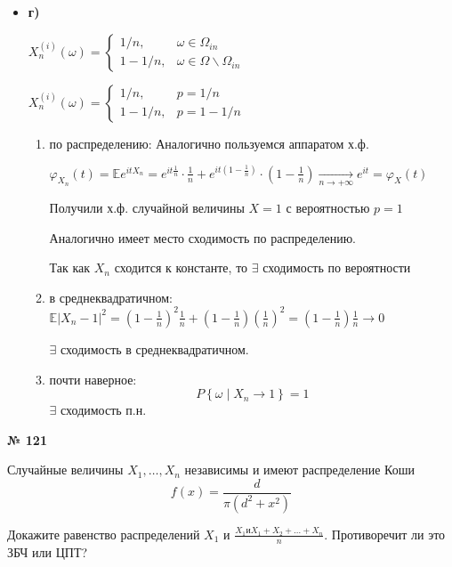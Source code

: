 \documentclass[a4paper,12pt]{article}
\newcommand{\lt}{\left}
\newcommand{\rt}{\right}
\newcommand{\fr}{\frac}
\newcommand{\bb}{\mathbb}
\newcommand{\om}{\Omega}
\newcommand{\vp}{\varphi}
\begin{document}
\begin{itemize}
\begin{enumerate}
\end{enumerate}

\item \textbf{г)}

$X_n^{(i)}(\omega) = 
\begin{cases}
1/n,& \omega \in \om_{in}\\
1 - 1/n,& \omega \in \om\backslash\om_{in}
\end{cases}
$

$X_n^{(i)}(\omega) = 
\begin{cases}
1/n,& p = 1/n\\
1 - 1/n,& p =  1 - 1/n
\end{cases}
$
\begin{enumerate}
\item по распределению:
Аналогично пользуемся аппаратом х.ф.

$\vp_{X_n}(t) = \bb E e^{itX_n} = e^{it\fr{1}{n}}\cdot\fr{1}{n} + e^{it\lt(1 - \fr{1}{n} \rt)}\cdot\lt(1 - \fr{1}{n}\rt) \xrightarrow[n \to +\infty]{} e^{it} = \vp_X(t)$

Получили х.ф. случайной величины $X = 1$ с вероятностью $p = 1$

Аналогично имеет место сходимость по распределению.

Так как $X_n$ сходится к константе, то $\exists$ сходимость по вероятности

\item в среднеквадратичном:
$\bb E|X_n - 1|^2  = \lt(1 - \fr{1}{n}\rt)^2\fr{1}{n} + \lt(1 - \fr{1}{n}\rt)\lt(\fr{1}{n}\rt)^2 = \lt(1 - \fr{1}{n}\rt)\fr{1}{n}\rightarrow 0$

$\exists$ сходимость в среднеквадратичном.

\item почти наверное:
$$P\lt\{\omega\mid X_n \rightarrow 1\rt\} = 1$$
$\exists$ сходимость п.н.
\end{enumerate}

\end{itemize}

\textbf {№ 121}

Случайные величины $X_1, \dots, X_n$ независимы и имеют распределение Коши
$$f(x) = \fr{d}{\pi(d^2 + x^2)}$$

Докажите равенство распределений $X_1$ и $\fr{X_1  и X_1 + X_2+ \dots + X_n}{n}$. Противоречит ли это ЗБЧ или ЦПТ?
\end{document}
